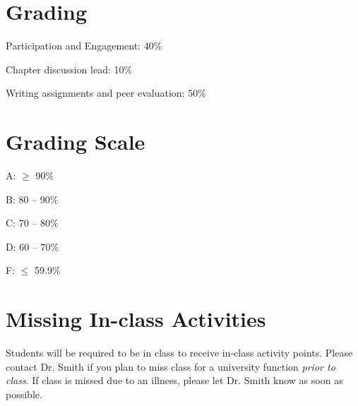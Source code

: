\documentclass[12pt, notitlepage]{article}   	%
\begin{document}
{\section{Grading}
Participation and Engagement: 40\% \par
Chapter discussion lead: 10\% \par
Writing assignments and peer evaluation: 50\% \par

\section{Grading Scale}
A: $\geq$ 90\% \par
B: 80 – 90\% \par
C: 70 – 80\% \par
D: 60 – 70\% \par
F: $\leq$ 59.9\% \par

\section{Missing In-class Activities}
Students will be required to be in class to receive in-class activity points. 
Please contact Dr. Smith if you plan to miss class for a university function 
\textit{prior to class}. If class is missed due to an illness, 
please let Dr. Smith know as soon as possible.

}
\end{document}
